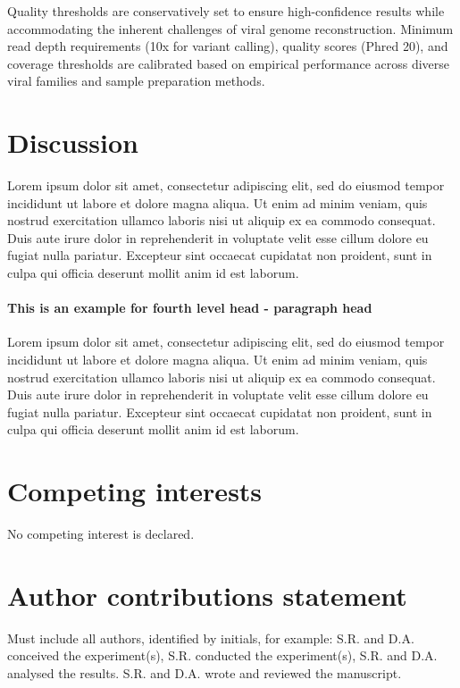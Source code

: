 \documentclass[unnumsec,webpdf,contemporary,large]{oup-authoring-template}%
\theoremstyle{thmstyleone}%
\theoremstyle{thmstyletwo}%
\theoremstyle{thmstylethree}%
\begin{document}
Quality thresholds are conservatively set to ensure high-confidence results while accommodating the inherent challenges of viral genome reconstruction. Minimum read depth requirements (10x for variant calling), quality scores (Phred 20), and coverage thresholds are calibrated based on empirical performance across diverse viral families and sample preparation methods.

\section{Discussion}\label{sec4}

Lorem ipsum dolor sit amet, consectetur adipiscing elit, sed do eiusmod tempor incididunt ut labore et dolore magna aliqua. Ut enim ad minim veniam, quis nostrud exercitation ullamco laboris nisi ut aliquip ex ea commodo consequat. Duis aute irure dolor in reprehenderit in voluptate velit esse cillum dolore eu fugiat nulla pariatur. Excepteur sint occaecat cupidatat non proident, sunt in culpa qui officia deserunt mollit anim id est laborum.

\paragraph{This is an example for fourth level head - paragraph head}

Lorem ipsum dolor sit amet, consectetur adipiscing elit, sed do eiusmod tempor incididunt ut labore et dolore magna aliqua. Ut enim ad minim veniam, quis nostrud exercitation ullamco laboris nisi ut aliquip ex ea commodo consequat. Duis aute irure dolor in reprehenderit in voluptate velit esse cillum dolore eu fugiat nulla pariatur. Excepteur sint occaecat cupidatat non proident, sunt in culpa qui officia deserunt mollit anim id est laborum.



\section{Competing interests}
No competing interest is declared.

\section{Author contributions statement}

Must include all authors, identified by initials, for example:
S.R. and D.A. conceived the experiment(s),  S.R. conducted the experiment(s), S.R. and D.A. analysed the results.  S.R. and D.A. wrote and reviewed the manuscript.
\end{document}
